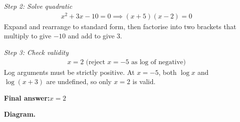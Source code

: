 \documentclass[11pt]{article}
\begin{document}
\textit{Step 2: Solve quadratic}
\[\begin{gathered}
x^2 + 3x - 10 = 0 \implies (x+5)(x-2) = 0
\end{gathered}\]
Expand and rearrange to standard form, then factorise into two brackets that multiply to give \( -10 \) and add to give \( 3 \).

\textit{Step 3: Check validity}
\[\begin{gathered}
x = 2 \text{ (reject } x = -5 \text{ as log of negative)}
\end{gathered}\]
Log arguments must be strictly positive. At \( x = -5 \), both \( \log x \) and \( \log(x+3) \) are undefined, so only \( x = 2 \) is valid.

\begin{answerbox}
\textbf{Final answer:}\quad \(\displaystyle x = 2\)
\end{answerbox}
\textbf{Diagram.}
\end{document}
